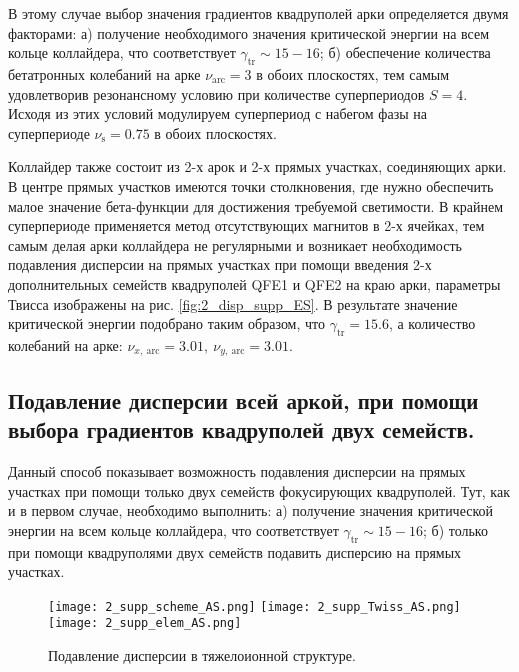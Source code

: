 \par В этому случае выбор значения градиентов квадруполей арки определяется двумя факторами:
	а) получение необходимого значения критической энергии на всем кольце коллайдера, что соответствует $\gamma_{\text{tr}}\sim15-16$;
	б) обеспечение количества бетатронных колебаний на арке $\nu_{\text{arc}}=3$ в обоих плоскостях, тем самым удовлетворив резонансному условию при количестве суперпериодов $S=4$. Исходя из этих условий модулируем суперпериод с набегом фазы на суперпериоде $\nu_{\text{s}}=0.75$ в обоих плоскостях.

\par Коллайдер также состоит из 2-х арок и 2-х прямых участках, соединяющих арки. В центре прямых участков имеются точки столкновения, где нужно обеспечить малое значение бета-функции для достижения требуемой светимости. В крайнем суперпериоде применяется метод отсутствующих магнитов в 2-х ячейках, тем самым делая арки коллайдера не регулярными и возникает необходимость подавления дисперсии на прямых участках при помощи введения 2-х дополнительных семейств квадруполей QFE1 и QFE2 на краю арки, параметры Твисса изображены на рис. \ref{fig:2_disp_supp_ES}. В результате значение критической энергии подобрано таким образом, что $\gamma_{\text{tr}}=15.6$, а количество колебаний на арке: $\nu_{x,\ \text{arc}}=3.01,\ \nu_{y,\ \text{arc}}=3.01$.

\subsection{Подавление дисперсии всей аркой, при помощи выбора градиентов квадруполей двух семейств.}\label{subsec:transition_variation/methods/disp_supperssion_AS}	

Данный способ показывает возможность подавления дисперсии на прямых участках при помощи только двух семейств фокусирующих квадруполей. Тут, как и в первом случае, необходимо выполнить:
	а) получение значения критической энергии на всем кольце коллайдера, что соответствует $\gamma_{\text{tr}}\sim15-16$;
	б) только при помощи квадруполями двух семейств подавить дисперсию на прямых участках.

\begin{figure} [h!]
	\center
	\texttt{[image: 2\_supp\_scheme\_AS.png]}
	\texttt{[image: 2\_supp\_Twiss\_AS.png]}
	\texttt{[image: 2\_supp\_elem\_AS.png]}
	\caption{Подавление дисперсии в тяжелоионной структуре.}
	\label{fig:2_disp_supp_AS}
\end{figure}
	
